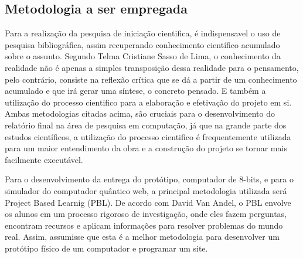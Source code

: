 \subsection{Metodologia a ser empregada}
Para a realização da pesquisa de iniciação cientifica, é indispensavel o uso de pesquisa bibliográfica, assim recuperando conhecimento científico acumulado sobre o assunto. Segundo Telma Cristiane Sasso de Lima, o conhecimento da realidade não é apenas a simples transposição dessa realidade para o pensamento, pelo contrário, consiste na reflexão crítica que se dá a partir de um conhecimento acumulado e que irá gerar uma síntese, o concreto pensado\cite{1}. E também a utilização do processo cientifico para a elaboração e efetivação do projeto em si. Ambas metodologias citadas acima, são cruciais para o desenvolvimento do relatório final na área de pesquisa em computação, já que na grande parte dos estudos científicos, a utilização do processo cientifico é frequentemente utilizada para um maior entendimento da obra e a construção do projeto se tornar mais facilmente executável.

Para o desenvolvimento da entrega do protótipo, computador de 8-bits, e para o simulador do computador quântico web, a principal metodologia utilizada será Project Based Learnig (PBL). De acordo com  David Van Andel, o PBL envolve os alunos em um processo rigoroso de investigação, onde eles fazem perguntas, encontram recursos e aplicam informações para resolver problemas do mundo real\cite{3}. Assim, assumisse que esta é a melhor metodologia para desenvolver um protótipo físico de um computador e programar um site.

\newpage